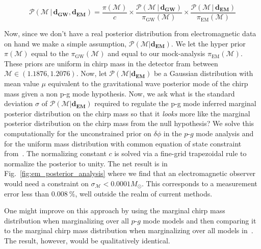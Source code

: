 \begin{equation}
    \mathcal{P}(\mathcal{M} \, |  \, \mathbf{d_{GW}}, \mathbf{d_{EM}}) = \frac{\pi(\mathcal{M})}{c} \times \frac{\mathcal{P}(\mathcal{M} \, | \, \mathbf{d_{GW}})}{\pi_{\mathrm{GW}}(\mathcal{M})} \times \frac{\mathcal{P}(\mathcal{M} \, | \, \mathbf{d_{EM}})}{\pi_{\mathrm{EM}}(\mathcal{M})}
\end{equation}

Now, since we don't have a real posterior distribution from electromagnetic data on hand we make a simple assumption, $\mathcal{P}(\mathcal{M} | \mathbf{d_{EM}})$. We let the hyper prior $\pi(\mathcal{M})$ equal to the $\pi_{\mathrm{GW}}(\mathcal{M})$ and equal to our mock-analysis $\pi_{\mathrm{EM}}(\mathcal{M})$. These priors are uniform in chirp mass in the detector fram between $\mathcal{M} \in (1.1876, 1.2076)$. Now, let $\mathcal{P}(\mathcal{M} | \mathbf{d_{EM}})$ be a Gaussian distribution with mean value $\mu$ equivalent to the gravitational wave posterior mode of the chirp mass given a non p-g mode hypothesis. Now, we ask what is the standard deviation $\sigma$ of $\mathcal{P}(\mathcal{M} | \mathbf{d_{EM}})$ required to regulate the p-g mode inferred marginal posterior distribution on the chirp mass so that it \textit{looks} more like the marginal posterior distribution on the chirp mass from the null hypothesis? We solve this computationally for the unconstrained prior on $\delta \phi$ in the $p$-$g$ mode analysis and for the uniform mass distribution with common equation of state constraint from~\cite{de2018tidal}. The normalizing constant $c$ is solved via a fine-grid trapezoidal rule to normalize the posterior to unity. The net result is in Fig.~\ref{fig:em_posterior_analysis} where we find that an electromagnetic observer would need a constraint on $\sigma_{\mathcal{M}} < 0.0001 M_{\odot}$. This corresponds to a measurement error less than $0.008~\%$, well outside the realm of current methods.

One might improve on this approach by using the marginal chirp mass distribution when marginalizing over all $p$-$g$ mode models and then comparing it to the marginal chirp mass distribution when marginalizing over all models in~\cite{de2018tidal}. The result, however, would be qualitatively identical.

